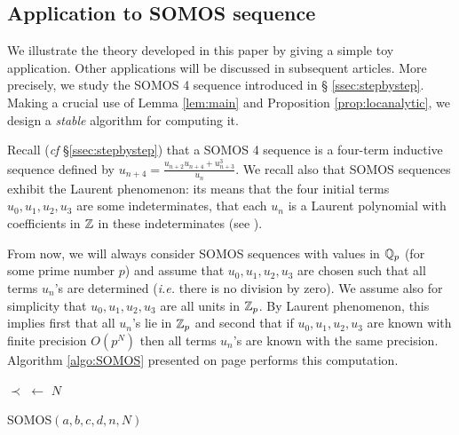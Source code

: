 \documentclass{lms}
\begin{document}
\subsection{Application to SOMOS sequence}
\label{ssec:SOMOS-solution}

We illustrate the theory developed in this paper by giving a simple 
toy application. Other applications will be discussed in subsequent 
articles. More precisely, we study the SOMOS 4 sequence introduced in \S 
\ref{ssec:stepbystep}. Making a crucial use of Lemma \ref{lem:main} and 
Proposition \ref{prop:locanalytic}, we design a \emph{stable} algorithm 
for computing it.

Recall (\emph{cf} \S \ref{ssec:stepbystep}) that a SOMOS 4 sequence is a 
four-term inductive sequence defined by $u_{n+4} = \frac{u_{n+2} u_{n+4} 
+ u_{n+3}^3}{u_n}$. We recall also that SOMOS sequences exhibit the 
Laurent phenomenon: its means that the four initial terms $u_0, u_1, 
u_2, u_3$ are some indeterminates, that each $u_n$ is a Laurent 
polynomial with coefficients in $\mathbb Z$ in these indeterminates
(see \cite{Fomin-Zelevinsky}).

From now, we will always consider SOMOS sequences with values in $\mathbb Q_p$ 
(for some prime number $p$) and assume that $u_0, u_1, u_2, u_3$ are 
chosen such that all terms $u_n$'s are determined (\emph{i.e.} there is 
no division by zero). We assume also for simplicity that $u_0, u_1, u_2, 
u_3$ are all units in $\mathbb Z_p$. By Laurent phenomenon, this implies first 
that all $u_n$'s lie in $\mathbb Z_p$ and second that if $u_0, u_1, u_2, u_3$ 
are known with finite precision $O(p^N)$ then all terms $u_n$'s are 
known with the same precision. Algorithm \ref{algo:SOMOS} presented on 
page \pageref{algo:SOMOS} performs this computation.

\begin{algorithm}[t]
\BlankLine
$\prec$ $\leftarrow$ $N$\;
\;
\caption{\sc SOMOS$(a, b, c, d, n, N)$}\label{algo:SOMOS}
\end{algorithm}
\end{document}
